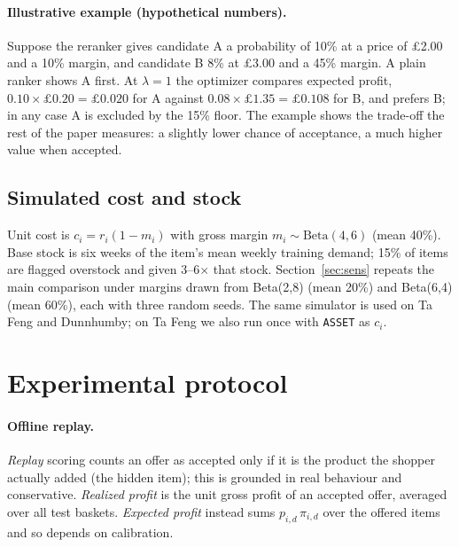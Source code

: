 \documentclass[11pt]{article}
\begin{document}
\paragraph{Illustrative example (hypothetical numbers).}
Suppose the reranker gives candidate A a probability of 10\% at a price of \pounds2.00 and a 10\% margin, and candidate B 8\% at \pounds3.00 and a 45\% margin.
A plain ranker shows A first.
At $\lambda{=}1$ the optimizer compares expected profit, $0.10\times\pounds0.20=\pounds0.020$ for A against $0.08\times\pounds1.35=\pounds0.108$ for B, and prefers B; in any case A is excluded by the 15\% floor.
The example shows the trade-off the rest of the paper measures: a slightly lower chance of acceptance, a much higher value when accepted.

\subsection{Simulated cost and stock}\label{sec:erp}
Unit cost is $c_i=r_i(1-m_i)$ with gross margin $m_i\sim\text{Beta}(4,6)$ (mean 40\%).
Base stock is six weeks of the item's mean weekly training demand; 15\% of items are flagged overstock and given 3--6$\times$ that stock.
Section~\ref{sec:sens} repeats the main comparison under margins drawn from Beta(2,8) (mean 20\%) and Beta(6,4) (mean 60\%), each with three random seeds.
The same simulator is used on Ta Feng and Dunnhumby; on Ta Feng we also run once with \texttt{ASSET} as $c_i$.

\section{Experimental protocol}

\paragraph{Offline replay.}
\emph{Replay} scoring counts an offer as accepted only if it is the product the shopper actually added (the hidden item); this is grounded in real behaviour and conservative.
\emph{Realized profit} is the unit gross profit of an accepted offer, averaged over all test baskets.
\emph{Expected profit} instead sums $p_{i,d}\,\pi_{i,d}$ over the offered items and so depends on calibration.
\end{document}
